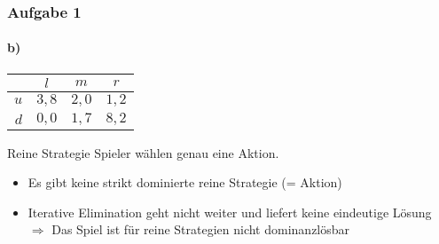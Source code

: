 \documentclass{beamer}
\begin{document}
\begin{frame}
	\frametitle{Aufgabe 1}
	\framesubtitle{b)}

	\centering
	\begin{tabular}{r|c|c|c|}
		& $l$ & $m$ & $r$ \\
		\hline
		$u$ & $3, 8$ & $2, 0$ & $1, 2$ \\
		$d$ & $0, 0$ & $1, 7$ & $8, 2$ \\
		\hline
	\end{tabular}

	\begin{block}{Reine Strategie}
		Spieler wählen genau eine Aktion.
	\end{block}

	\begin{itemize}
		\item Es gibt keine strikt dominierte reine Strategie (= Aktion) 
		\item Iterative Elimination  geht nicht weiter und liefert keine eindeutige Lösung\\
		$\Rightarrow$ Das Spiel ist für reine Strategien nicht dominanzlösbar
	\end{itemize}

\end{frame}
\end{document}
